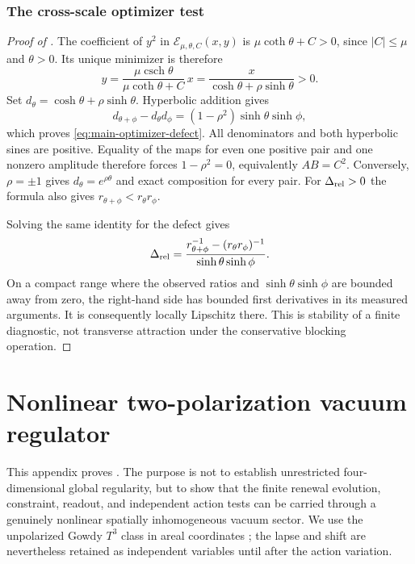 \documentclass[11pt]{article}
\theoremstyle{definition}
\theoremstyle{remark}
\begin{document}

\subsubsection{The cross-scale optimizer test}

\begin{proof}[Proof of ]
The coefficient of $y^2$ in
$\mathcal E_{\mu,\theta,C}(x,y)$ is $\mu\coth\theta+C>0$, since
$|C|\le\mu$ and $\theta>0$.  Its unique minimizer is therefore
\[
 y=\frac{\mu\operatorname{csch}\theta}{\mu\coth\theta+C}\,x
       =\frac{x}{\cosh\theta+\rho\sinh\theta}>0.
\]
Set $d_\theta=\cosh\theta+\rho\sinh\theta$.  Hyperbolic addition gives
\[
 d_{\theta+\phi}-d_\theta d_\phi
       =(1-\rho^2)\sinh\theta\sinh\phi,
\]
which proves \eqref{eq:main-optimizer-defect}.  All denominators and both
hyperbolic sines are positive.  Equality of the maps for even one positive
pair and one nonzero amplitude therefore forces $1-\rho^2=0$, equivalently
$AB=C^2$.  Conversely, $\rho=\pm1$ gives $d_\theta=e^{\rho\theta}$ and
exact composition for every pair.  For $\Delta_{\rm rel}>0$ the formula
also gives $r_{\theta+\phi}<r_\theta r_\phi$.

Solving the same identity for the defect gives
\begin{equation}
 \Delta_{\rm rel}
 =\frac{r_{\theta+\phi}^{-1}-(r_\theta r_\phi)^{-1}}
              {\sinh\theta\sinh\phi}.
 \label{eq:supp-optimizer-defect-read}
\end{equation}
On a compact range where the observed ratios and
$\sinh\theta\sinh\phi$ are bounded away from zero, the right-hand side
has bounded first derivatives in its measured arguments.  It is consequently
locally Lipschitz there.  This is stability of a finite diagnostic, not
transverse attraction under the conservative blocking operation.
\end{proof}

\section{Nonlinear two-polarization vacuum regulator}
\label{supp:gowdy}

This appendix proves .  The purpose is not to
establish unrestricted four-dimensional global regularity, but to show that the
finite renewal evolution, constraint, readout, and independent action tests can
be carried through a genuinely nonlinear spatially inhomogeneous vacuum sector.
We use the unpolarized Gowdy $T^3$ class in areal coordinates
\cite{Moncrief1981}; the lapse and shift are nevertheless retained as
independent variables until after the action variation.
\end{document}
